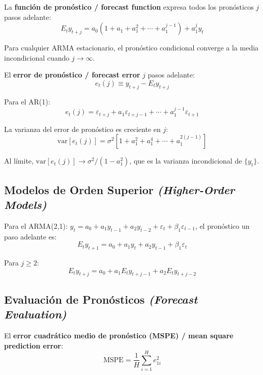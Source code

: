 \documentclass[12pt]{article}
\begin{document}
La \textbf{funci\'on de pron\'ostico / forecast function} expresa todos los pron\'osticos $j$ pasos adelante:
\begin{equation}
E_t y_{t+j} = a_0\!\left(1 + a_1 + a_1^2 + \cdots + a_1^{j-1}\right) + a_1^j y_t
\end{equation}

Para cualquier ARMA estacionario, el pron\'ostico condicional converge a la media incondicional cuando $j\to\infty$.

El \textbf{error de pron\'ostico / forecast error} $j$ pasos adelante:
\begin{equation}
e_t(j) \equiv y_{t+j} - E_t y_{t+j}
\end{equation}

Para el AR(1):
\begin{equation}
e_t(j) = \varepsilon_{t+j} + a_1\varepsilon_{t+j-1} + \cdots + a_1^{j-1}\varepsilon_{t+1}
\end{equation}

La varianza del error de pron\'ostico es creciente en $j$:
\begin{equation}
\text{var}[e_t(j)] = \sigma^2\!\left[1 + a_1^2 + a_1^4 + \cdots + a_1^{2(j-1)}\right]
\end{equation}

Al l\'imite, $\text{var}[e_t(j)] \to \sigma^2/(1-a_1^2)$, que es la varianza incondicional de $\{y_t\}$.

\subsection{Modelos de Orden Superior \textit{(Higher-Order Models)}}

Para el ARMA(2,1): $y_t = a_0 + a_1 y_{t-1} + a_2 y_{t-2} + \varepsilon_t + \beta_1\varepsilon_{t-1}$, el pron\'ostico un paso adelante es:
\begin{equation}
E_t y_{t+1} = a_0 + a_1 y_t + a_2 y_{t-1} + \beta_1\varepsilon_t
\end{equation}

Para $j \ge 2$:
\begin{equation}
E_t y_{t+j} = a_0 + a_1 E_t y_{t+j-1} + a_2 E_t y_{t+j-2}
\end{equation}

\subsection{Evaluaci\'on de Pron\'osticos \textit{(Forecast Evaluation)}}

El \textbf{error cuadr\'atico medio de pron\'ostico (MSPE) / mean square prediction error}:
\begin{equation}
\text{MSPE} = \frac{1}{H}\sum_{i=1}^{H} e_{1i}^2
\end{equation}
\end{document}
